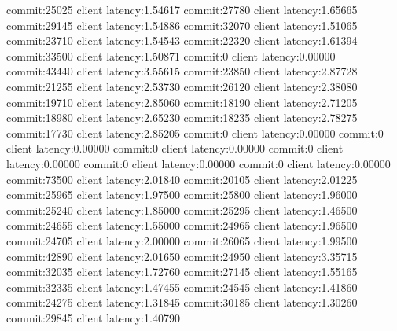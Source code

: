 commit:25025 client latency:1.54617
commit:27780 client latency:1.65665
commit:29145 client latency:1.54886
commit:32070 client latency:1.51065
commit:23710 client latency:1.54543
commit:22320 client latency:1.61394
commit:33500 client latency:1.50871
commit:0 client latency:0.00000
commit:43440 client latency:3.55615
commit:23850 client latency:2.87728
commit:21255 client latency:2.53730
commit:26120 client latency:2.38080
commit:19710 client latency:2.85060
commit:18190 client latency:2.71205
commit:18980 client latency:2.65230
commit:18235 client latency:2.78275
commit:17730 client latency:2.85205
commit:0 client latency:0.00000
commit:0 client latency:0.00000
commit:0 client latency:0.00000
commit:0 client latency:0.00000
commit:0 client latency:0.00000
commit:0 client latency:0.00000
commit:73500 client latency:2.01840
commit:20105 client latency:2.01225
commit:25965 client latency:1.97500
commit:25800 client latency:1.96000
commit:25240 client latency:1.85000
commit:25295 client latency:1.46500
commit:24655 client latency:1.55000
commit:24965 client latency:1.96500
commit:24705 client latency:2.00000
commit:26065 client latency:1.99500
commit:42890 client latency:2.01650
commit:24950 client latency:3.35715
commit:32035 client latency:1.72760
commit:27145 client latency:1.55165
commit:32335 client latency:1.47455
commit:24545 client latency:1.41860
commit:24275 client latency:1.31845
commit:30185 client latency:1.30260
commit:29845 client latency:1.40790